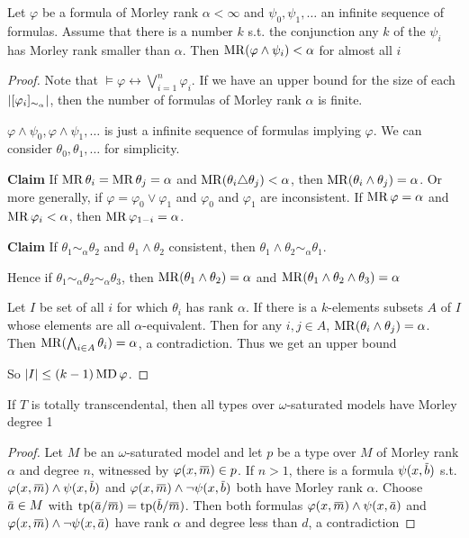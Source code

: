 \documentclass[11pt]{article}
\begin{document}
\begin{exercise}
\label{ex6.2.2}
Let \(\varphi\) be a formula of Morley rank \(\alpha<\infty\) and \(\psi_0,\psi_1,\dots\) an infinite sequence of formulas.
Assume that there is a number \(k\) s.t. the conjunction any \(k\) of the \(\psi_i\) has Morley rank
smaller than \(\alpha\). Then \(\operatorname{MR}(\varphi\wedge\psi_i)<\alpha\)  for almost all \(i\)
\end{exercise}

\begin{proof}
Note that \(\vDash\varphi\leftrightarrow\bigvee_{i=1}^{n}\varphi_i\). If we have an upper bound for the size of
each \(\abs{[\varphi_i]_{\sim_\alpha}}\), then the number of formulas of Morley rank \(\alpha\) is finite.

\(\varphi\wedge\psi_0,\varphi\wedge\psi_1,\dots\) is just a infinite sequence of formulas implying \(\varphi\). We can
consider \(\theta_0,\theta_1,\dots\) for simplicity.

\textbf{Claim} If \(\operatorname{MR}\theta_i=\operatorname{MR}\theta_j=\alpha\) and \(\operatorname{MR}(\theta_i\triangle\theta_j)<\alpha\), then \(\operatorname{MR}(\theta_i\wedge\theta_j)=\alpha\). Or more generally,
if \(\varphi=\varphi_0\vee\varphi_1\) and \(\varphi_0\) and \(\varphi_1\) are inconsistent. If \(\operatorname{MR}\varphi=\alpha\) and \(\operatorname{MR}\varphi_i<\alpha\),
then \(\operatorname{MR}\varphi_{1-i}=\alpha\).

\textbf{Claim} If \(\theta_1\sim_\alpha\theta_2\) and \(\theta_1\wedge\theta_2\) consistent, then \(\theta_1\wedge\theta_2\sim_\alpha\theta_1\).

Hence if \(\theta_1\sim_\alpha\theta_2\sim_\alpha\theta_3\), then \(\operatorname{MR}(\theta_1\wedge\theta_2)=\alpha\) and \(\operatorname{MR}(\theta_1\wedge\theta_2\wedge\theta_3)=\alpha\)

Let \(I\) be set of all \(i\) for which \(\theta_i\) has rank \(\alpha\). If there is a \(k\)-elements
subsets \(A\) of \(I\) whose elements are all \(\alpha\)-equivalent. Then for
any \(i,j\in A\), \(\operatorname{MR}(\theta_i\wedge\theta_j)=\alpha\). Then \(\operatorname{MR}(\bigwedge_{i\in A}\theta_i)=\alpha\), a contradiction. Thus we get an
upper bound

So \(\abs{I}\le(k-1)\MD\varphi\).
\end{proof}

\begin{exercise}
\label{ex6.2.4}
If \(T\) is totally transcendental, then all types over \(\omega\)-saturated models have Morley degree 1
\end{exercise}

\begin{proof}
Let \(M\) be an \(\omega\)-saturated model and let \(p\) be a type over \(M\) of Morley rank \(\alpha\) and
degree \(n\), witnessed by \(\varphi(x,\barm)\in p\). If \(n>1\), there is a formula \(\psi(x,\barb)\) s.t.
\(\varphi(x,\barm)\wedge\psi(x,\barb)\) and \(\varphi(x,\barm)\wedge\neg\psi(x,\barb)\) both have Morley rank \(\alpha\).
Choose \(\bara\in M\) with \(\tp(\bara/\barm)=\tp(\barb/\barm)\). Then both formulas
\(\varphi(x,\barm)\wedge\psi(x,\bara)\) and \(\varphi(x,\barm)\wedge\neg\psi(x,\bara)\) have rank \(\alpha\) and degree less than \(d\),
a contradiction
\end{proof}
\end{document}
